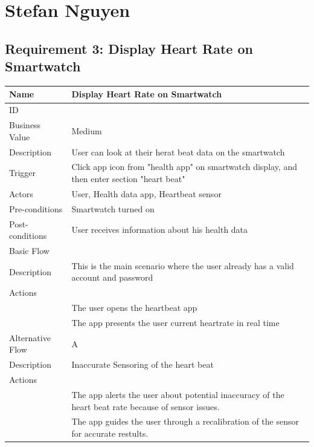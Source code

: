 \documentclass{article}
\begin{document}
\section{Stefan Nguyen}

\subsection{Requirement 3: Display Heart Rate on Smartwatch}
	\begin{center}
		\begin{tabularx}{1.0\textwidth}{|>{\raggedright\arraybackslash}p{}|>{\raggedright\arraybackslash}X|}
			\hline
			Name             & Display Heart Rate on Smartwatch \\ \hline
			ID               & 3 \\ \hline
			Business Value   & Medium \\ \hline
			Description      & User can look at their herat beat data on the smartwatch \\ \hline
			Trigger          & Click app icon from "health app" on smartwatch display, and then enter section "heart beat" \\ \hline
			Actors           & User, Health data app, Heartbeat sensor \\ \hline
			Pre-conditions   & Smartwatch turned on \\ \hline
			Post-conditions  & User receives information about his health data \\ \hline
			Basic Flow       & \\ \hline
							Description & This is the main scenario where the user already has a valid account and password \\ \hline
							Actions & \\ \hline
							1 & The user opens the heartbeat app \\ \hline
							2 & The app presents the user current heartrate in real time \\ \hline
			Alternative Flow & A \\ \hline
							Description & Inaccurate Sensoring of the heart beat \\ \hline
							Actions & \\ \hline
							1 & The app alerts the user about potential inaccuracy of the heart beat rate because of sensor issues. \\ \hline
							2 & The app guides the user through a recalibration of the sensor for accurate restults.  \\ \hline

\end{tabularx}
\end{center}
\end{document}
